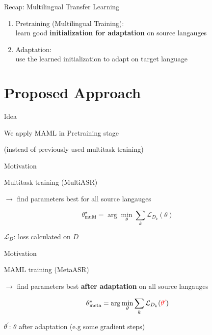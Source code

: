 \documentclass{beamer}
\begin{document}
\begin{frame}[t]{Recap: Multilingual Transfer Learning}

  \begin{enumerate}
    \item Pretraining (Multilingual Training): \\ learn good \textbf{initialization for adaptation} on source langauges
    \item Adaptation: \\ use the learned initialization to adapt on target language
  \end{enumerate}
\end{frame}

\section{Proposed Approach}
\begin{frame}[t]{Idea}
	\begin{center}
    \LARGE{We apply MAML in Pretraining stage}
	\end{center}

  \vspace{3em}
  (instead of previously used multitask training)
\end{frame}


\begin{frame}[t]{Motivation}
	\begin{center}
    \LARGE{Multitask training (MultiASR)}
	\end{center}
  \vspace{3em}
  $\rightarrow$ find parameters best for all source langauges

  \begin{equation*}
    \theta_{\text{multi}}^\star = \arg \min_\theta \sum_k \mathcal{L}_{D_k}(\theta)
  \end{equation*}

  $\mathcal{L}_D$: loss calculated on $D$
\end{frame}

\begin{frame}[t]{Motivation}
	\begin{center}
    \LARGE{MAML training (MetaASR)}
	\end{center}
  \vspace{3em}
  $\rightarrow$ find parameters best \textbf{after adaptation} on all source langauges

  \begin{equation*}
    \theta_{\text{meta}}^\star = \arg \min_\theta \sum_k \mathcal{L}_{D_k}(\textcolor{red}{\theta^\prime})
  \end{equation*}

  $\theta^\prime$: $\theta$ after adaptation (e.g some gradient steps) \\
  \flushright \hyperlink{overview of maml}{}
\end{frame}
\end{document}
